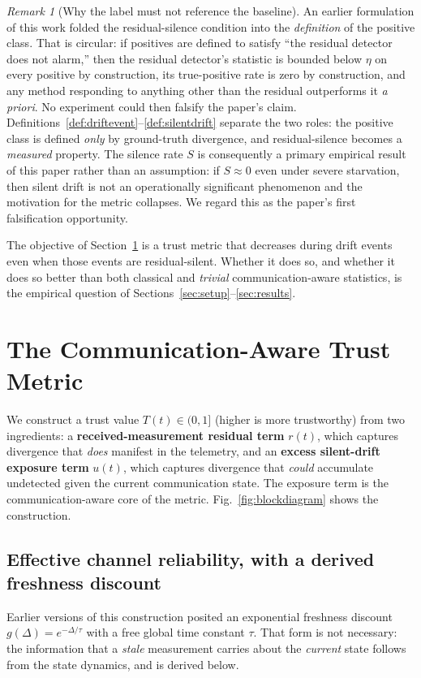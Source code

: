 \documentclass[journal]{IEEEtran}
\theoremstyle{plain}
\theoremstyle{definition}
\theoremstyle{remark}
\newtheorem{remark}{Remark}
\begin{document}
\begin{remark}[Why the label must not reference the baseline]
\label{rem:circularity}
An earlier formulation of this work folded the residual-silence condition
into the \emph{definition} of the positive class. That is circular: if
positives are defined to satisfy ``the residual detector does not alarm,''
then the residual detector's statistic is bounded below $\eta$ on every
positive by construction, its true-positive rate is zero by construction,
and any method responding to anything other than the residual outperforms
it \emph{a priori}. No experiment could then falsify the paper's claim.
Definitions~\ref{def:driftevent}--\ref{def:silentdrift} separate the two
roles: the positive class is defined \emph{only} by ground-truth
divergence, and residual-silence becomes a \emph{measured} property. The
silence rate $S$ is consequently a primary empirical result of this paper
rather than an assumption: if $S\approx0$ even
under severe starvation, then silent drift is not an operationally
significant phenomenon and the motivation for the metric collapses. We
regard this as the paper's first falsification opportunity.
\end{remark}

The objective of Section~\ref{sec:metric} is a trust metric that
decreases during drift events even when those events are residual-silent.
Whether it does so, and whether it does so better than both classical and
\emph{trivial} communication-aware statistics, is the empirical question
of Sections~\ref{sec:setup}--\ref{sec:results}.

\section{The Communication-Aware Trust Metric}
\label{sec:metric}

We construct a trust value $T(t)\in(0,1]$ (higher is more trustworthy)
from two ingredients: a \textbf{received-measurement residual term}
$r(t)$, which captures divergence that \emph{does} manifest in the
telemetry, and an \textbf{excess silent-drift exposure term} $u(t)$, which
captures divergence that \emph{could} accumulate undetected given the
current communication state. The exposure term is the
communication-aware core of the metric. Fig.~\ref{fig:blockdiagram} shows
the construction.

\subsection{Effective channel reliability, with a derived freshness discount}
Earlier versions of this construction posited an exponential freshness
discount $g(\Delta)=e^{-\Delta/\tau}$ with a free global time constant
$\tau$. That form is not necessary: the information that a \emph{stale}
measurement carries about the \emph{current} state follows from the state
dynamics, and is derived below.
\end{document}
